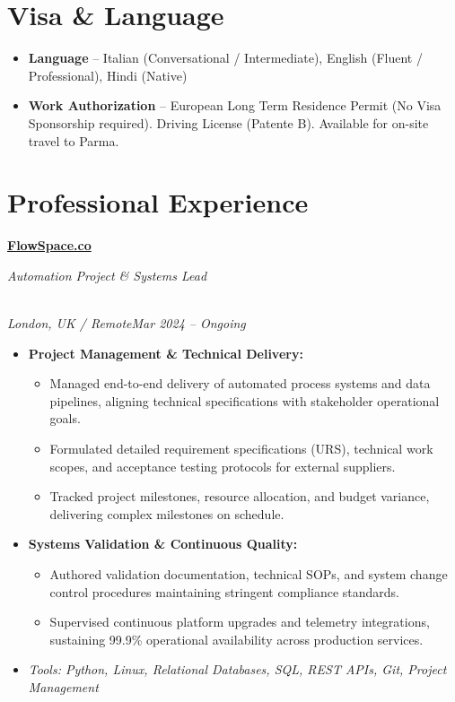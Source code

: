 \documentclass[a4paper,10pt]{article}
\newcommand{\role}[4]{\vspace{3pt}\noindent\hspace{0.6em}\parbox[t]{0.38\textwidth}{\raggedright\textbf{#1}}\hfill\parbox[t]{0.58\textwidth}{\raggedleft\textit{#2}}\\{\textit{#3}\hfill\textit{#4}}\vspace{1pt}}
\begin{document}
\section{Visa \& Language}
\begin{itemize}
\item \textbf{Language} -- Italian (Conversational / Intermediate), English (Fluent / Professional), Hindi (Native)
\item \textbf{Work Authorization} -- European Long Term Residence Permit (No Visa Sponsorship required). Driving License (Patente B). Available for on-site travel to Parma.
\end{itemize}

\section{Professional Experience}
\role{\href{https://flowspace.co}{FlowSpace.co}}{Automation Project \& Systems Lead}{London, UK / Remote}{Mar 2024 -- Ongoing}
\begin{itemize}
\item \textbf{Project Management \& Technical Delivery:}
\begin{itemize}[label=--]
\item Managed end-to-end delivery of automated process systems and data pipelines, aligning technical specifications with stakeholder operational goals.
\item Formulated detailed requirement specifications (URS), technical work scopes, and acceptance testing protocols for external suppliers.
\item Tracked project milestones, resource allocation, and budget variance, delivering complex milestones on schedule.
\end{itemize}
\item \textbf{Systems Validation \& Continuous Quality:}
\begin{itemize}[label=--]
\item Authored validation documentation, technical SOPs, and system change control procedures maintaining stringent compliance standards.
\item Supervised continuous platform upgrades and telemetry integrations, sustaining 99.9\% operational availability across production services.
\end{itemize}
\item \textit{Tools: Python, Linux, Relational Databases, SQL, REST APIs, Git, Project Management}
\end{itemize}
\end{document}
